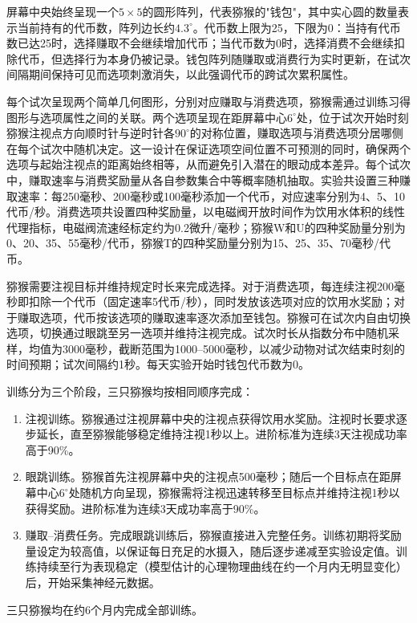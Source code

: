 屏幕中央始终呈现一个$5\times5$的圆形阵列，代表猕猴的"钱包"，其中实心圆的数量表示当前持有的代币数，阵列边长约$4.3^\circ$。代币数上限为25，下限为0：当持有代币数已达25时，选择赚取不会继续增加代币；当代币数为0时，选择消费不会继续扣除代币，但选择行为本身仍被记录。钱包阵列随赚取或消费行为实时更新，在试次间隔期间保持可见而选项刺激消失，以此强调代币的跨试次累积属性。

每个试次呈现两个简单几何图形，分别对应赚取与消费选项，猕猴需通过训练习得图形与选项属性之间的关联。两个选项呈现在距屏幕中心$6^\circ$处，位于试次开始时刻猕猴注视点方向顺时针与逆时针各$90^\circ$的对称位置，赚取选项与消费选项分居哪侧在每个试次中随机决定。这一设计在保证选项空间位置不可预测的同时，确保两个选项与起始注视点的距离始终相等，从而避免引入潜在的眼动成本差异。每个试次中，赚取速率与消费奖励量从各自参数集合中等概率随机抽取。实验共设置三种赚取速率：每250毫秒、200毫秒或100毫秒添加一个代币，对应速率分别为4、5、10代币/秒。消费选项共设置四种奖励量，以电磁阀开放时间作为饮用水体积的线性代理指标，电磁阀流速经标定约为0.2微升/毫秒；猕猴W和U的四种奖励量分别为0、20、35、55毫秒/代币，猕猴T的四种奖励量分别为15、25、35、70毫秒/代币。

猕猴需要注视目标并维持规定时长来完成选择。对于消费选项，每连续注视200毫秒即扣除一个代币（固定速率5代币/秒），同时发放该选项对应的饮用水奖励；对于赚取选项，代币按该选项的赚取速率逐次添加至钱包。猕猴可在试次内自由切换选项，切换通过眼跳至另一选项并维持注视完成。试次时长从指数分布中随机采样，均值为3000毫秒，截断范围为1000–5000毫秒，以减少动物对试次结束时刻的时间预期；试次间隔约1秒。每天实验开始时钱包代币数为0。

训练分为三个阶段，三只猕猴均按相同顺序完成：
\begin{enumerate}
    \item 注视训练。猕猴通过注视屏幕中央的注视点获得饮用水奖励。注视时长要求逐步延长，直至猕猴能够稳定维持注视1秒以上。进阶标准为连续3天注视成功率高于90\%。
    \item 眼跳训练。猕猴首先注视屏幕中央的注视点500毫秒；随后一个目标点在距屏幕中心$6^\circ$处随机方向呈现，猕猴需将注视迅速转移至目标点并维持注视1秒以获得奖励。进阶标准为连续3天成功率高于90\%。
    \item 赚取–消费任务。完成眼跳训练后，猕猴直接进入完整任务。训练初期将奖励量设定为较高值，以保证每日充足的水摄入，随后逐步递减至实验设定值。训练持续至行为表现稳定（模型估计的心理物理曲线在约一个月内无明显变化）后，开始采集神经元数据。
\end{enumerate}

三只猕猴均在约6个月内完成全部训练。

